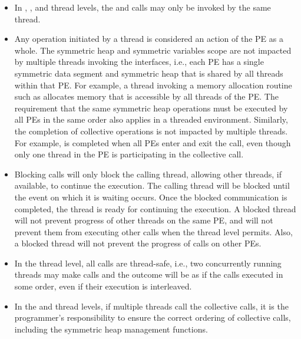 \begin{itemize}
\item
In , , and
 thread levels, the  and
 calls may only be invoked by the same thread.

\item
Any \openshmem operation initiated by a thread is considered an action of the
\ac{PE} as a whole. The symmetric heap and symmetric variables scope are not
impacted by multiple threads invoking the \openshmem interfaces, i.e.,
each \ac{PE} has a single symmetric data segment and symmetric heap that is shared by
all threads within that \ac{PE}.  For example, a thread invoking a memory allocation
routine such as  allocates memory that is accessible by
all threads of the \ac{PE}. The requirement that the same symmetric heap operations
must be executed by all \acp{PE} in the same order also applies in a threaded
environment. Similarly, the completion of collective operations is not impacted
by multiple threads. For example,  is completed when
all \acp{PE} enter and exit the  call, even though
only one thread in the \ac{PE} is participating in the collective call.

\item Blocking \openshmem calls will only block the calling thread, allowing
other threads, if available, to continue the execution. The calling thread will
be blocked until the event on which it is waiting occurs. Once the blocked communication is
completed, the thread is ready for continuing the execution. A blocked thread
will not prevent progress of other threads on the same \ac{PE}, and will not
prevent them from executing other \openshmem calls when the thread level permits.
Also, a blocked thread will not prevent the progress of \openshmem calls on other \acp{PE}.

\item In the  thread level, all \openshmem calls are thread-safe,
i.e., two concurrently running threads may make \openshmem calls and the outcome
will be as if the calls executed in some order, even if their execution is interleaved.

\item In the  and  thread levels,
if multiple threads call the collective calls, it is the programmer's responsibility
to ensure the correct ordering of collective calls, including the symmetric
heap management functions.

\end{itemize}
